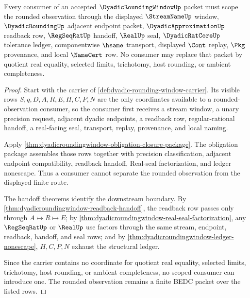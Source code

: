 \begin{theorem}
\label{thm:dyadicroundingwindow-scoped-consumer-boundary}
Every consumer of an accepted $\DyadicRoundingWindowUp$ packet must scope the rounded observation through the displayed $\StreamNameUp$ window, $\DyadicRoundingUp$ adjacent endpoint packet, $\DyadicApproximationUp$ readback row, $\RegSeqRatUp$ handoff, $\RealUp$ seal, $\DyadicRatCoreUp$ tolerance ledger, componentwise $\hsame$ transport, displayed $\Cont$ replay, $\Pkg$ provenance, and local $\NameCert$ row. No consumer may replace that packet by quotient real equality, selected limits, trichotomy, host rounding, or ambient completeness.
\end{theorem}
\begin{proof}
Start with the carrier of \autoref{def:dyadic-rounding-window-carrier}. Its visible rows $S,q,D,A,R,E,H,C,P,N$ are the only coordinates available to a rounded-observation consumer, so the consumer first receives a stream window, a unary precision request, adjacent dyadic endpoints, a readback row, regular-rational handoff, a real-facing seal, transport, replay, provenance, and local naming.

Apply \autoref{thm:dyadicroundingwindow-obligation-closure-package}. The obligation package assembles those rows together with precision classification, adjacent endpoint compatibility, readback handoff, Real-seal factorization, and ledger nonescape. Thus a consumer cannot separate the rounded observation from the displayed finite route.

The handoff theorems identify the downstream boundary. By \autoref{thm:dyadicroundingwindow-readback-handoff}, the readback row passes only through $A\mapsto R\mapsto E$; by \autoref{thm:dyadicroundingwindow-real-seal-factorization}, any $\RegSeqRatUp$ or $\RealUp$ use factors through the same stream, endpoint, readback, handoff, and seal rows; and by \autoref{thm:dyadicroundingwindow-ledger-nonescape}, $H,C,P,N$ exhaust the structural ledger.

Since the carrier contains no coordinate for quotient real equality, selected limits, trichotomy, host rounding, or ambient completeness, no scoped consumer can introduce one. The rounded observation remains a finite BEDC packet over the listed rows.
\end{proof}

